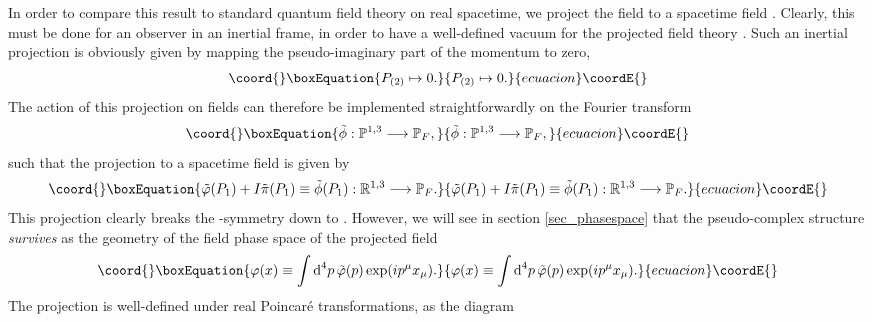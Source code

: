 \documentclass[a4paper,aps,prd,showkeys,showpacs,superscriptaddress,preprint]{revtex4}
\providecommand{\pc}{\mathbb{P}}
\providecommand{\reals}{\mathbb{R}}
\begin{document}
In order to
compare this result to standard quantum field theory on real
spacetime, we project the field \myHighlight{$\phi: \pc^{1,3} \longrightarrow
\pc_F$}\coordHE{} to a spacetime field \myHighlight{$\varphi + I \pi: \reals^{1,3}
\longrightarrow \pc_F$}\coordHE{}. Clearly, this must be done for an observer in an inertial
frame, in order to have a well-defined vacuum for the projected field
theory \cite{Unruh}. Such an inertial projection is obviously given by
mapping the pseudo-imaginary part of the momentum \coordHE{} to zero,
\begin{equation}\coord{}\boxEquation{
  P_{(2)} \mapsto 0.\label{projection1}
}{
  P_{(2)} \mapsto 0.}{ecuacion}\coordE{}\end{equation}
The action of this projection on fields can therefore be
 implemented straightforwardly on the Fourier transform
\begin{equation}\coord{}\boxEquation{
  \tilde\phi: \pc^{1,3} \longrightarrow \pc_F,
}{
  \tilde\phi: \pc^{1,3} \longrightarrow \pc_F,
}{ecuacion}\coordE{}\end{equation}
such that the projection to a spacetime field is given by
\begin{equation}\coord{}\boxEquation{
  \tilde \varphi (P_1) + I \tilde \pi(P_1) \equiv \tilde \phi(P_1) : \reals^{1,3}
  \longrightarrow \pc_F.\label{projection2}
}{
  \tilde \varphi (P_1) + I \tilde \pi(P_1) \equiv \tilde \phi(P_1) : \reals^{1,3}
  \longrightarrow \pc_F.}{ecuacion}\coordE{}\end{equation}
This projection clearly breaks the \myHighlight{$\mathcal{P}_\pc$}\coordHE{}-symmetry down to
\myHighlight{$\mathcal{P}_\reals$}\coordHE{}. However, we will see in section
\ref{sec_phasespace} that the pseudo-complex structure \textsl{survives} as the
geometry of the field phase space \myHighlight{$(\varphi,\pi)$}\coordHE{} of the projected field
\begin{equation}\coord{}\boxEquation{
  \varphi(x) \equiv \int \textrm{d}^4p\, \tilde\varphi(p) \exp(ip^\mu x_\mu). 
}{
  \varphi(x) \equiv \int \textrm{d}^4p\, \tilde\varphi(p) \exp(ip^\mu x_\mu). 
}{ecuacion}\coordE{}\end{equation}
The projection \myHighlight{$\tilde\phi \mapsto \tilde\varphi$}\coordHE{} is well-defined under real
Poincar\'e transformations, as the diagram
\end{document}
